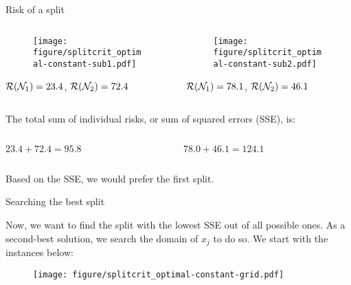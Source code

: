 \documentclass[11pt,compress,t,notes=noshow, xcolor=table]{beamer}
\begin{document}
\begin{vbframe}{Risk of a split}

\begin{columns}
\begin{column}{0.5\textwidth}


\begin{figure}
\texttt{[image: figure/splitcrit\_optimal-constant-sub1.pdf]} 
\end{figure}

$\mathcal{R}(\mathcal{N}_1) = 23.4$, $\mathcal{R}(\mathcal{N}_2) = 72.4$ 
 
\end{column}
\begin{column}{0.5\textwidth}

\begin{figure}
\texttt{[image: figure/splitcrit\_optimal-constant-sub2.pdf]} 
\end{figure}

$\mathcal{R}(\mathcal{N}_1) = 78.1$, $\mathcal{R}(\mathcal{N}_2) = 46.1$

\end{column}
\end{columns}
\vspace{0.1in}

The total sum of individual risks, or sum of squared errors (SSE), is:
\vspace{0.1in}

\begin{columns}
\begin{column}{0.5\textwidth}
$23.4 + 72.4 = 95.8$
\end{column}

\begin{column}{0.5\textwidth}
$78.0 + 46.1 = 124.1$ 
\end{column}
\end{columns}

\vspace{0.1in}
Based on the SSE, we would prefer the first split.

\end{vbframe}

\begin{vbframe}{Searching the best split}

Now, we want to find the split with the lowest SSE out of all possible ones.
As a second-best solution, we search the domain of $x_j$ to do so.
We start with the instances below:

\begin{figure}
\texttt{[image: figure/splitcrit\_optimal-constant-grid.pdf]} 
\end{figure}


\end{vbframe}
\end{document}

